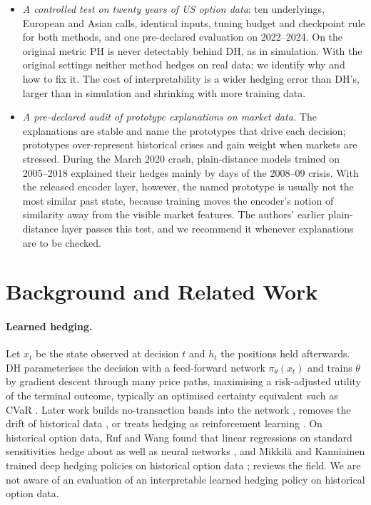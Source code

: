\documentclass[runningheads]{llncs}
\begin{document}
\begin{itemize}
\item \emph{A controlled test on twenty years of US option data}: ten underlyings, European and Asian
calls, identical inputs, tuning budget and checkpoint rule for both methods, and one pre-declared
evaluation on 2022--2024. On the original metric PH is never detectably behind DH, as in simulation. With
the original settings neither method hedges on real data; we identify why and how to fix it. The cost of interpretability is a wider hedging error than DH's, larger than in simulation and
shrinking with more training data.
\item \emph{A pre-declared audit of prototype explanations on market data.} The explanations are stable and
name the prototypes that drive each decision; prototypes over-represent historical crises and gain weight
when markets are stressed. During the March 2020 crash, plain-distance models trained on 2005--2018
explained their hedges mainly by days of the 2008--09 crisis. With the released encoder layer, however, the
named prototype is usually not the most similar past state, because training moves the encoder's notion of
similarity away from the visible market features. The authors' earlier plain-distance layer passes this test, and we recommend it
whenever explanations are to be checked.
\end{itemize}

\section{Background and Related Work}

\paragraph{Learned hedging.} Let $x_t$ be the state observed at decision $t$ and $h_t$ the positions held
afterwards. DH parameterises the decision with a feed-forward network $\pi_\theta(x_t)$ and trains $\theta$
by gradient descent through many price paths, maximising a risk-adjusted utility of the terminal outcome,
typically an optimised certainty equivalent such as CVaR \cite{rockafellar2000,bental2007oce,buehler2019deep}.
Later work builds no-transaction bands into the network \cite{imaki2021notransaction}, removes the drift of
historical data \cite{buehler2021drift}, or treats hedging as reinforcement learning
\cite{halperin2020qlbs,kolm2019dynamic,cao2021deep,vittori2020option}. On historical option data, Ruf and
Wang found that linear regressions on standard sensitivities hedge about as well as neural networks
\cite{ruf2022hedging}, and Mikkil\"a and Kanniainen trained deep hedging policies on historical option data
\cite{mikkila2023empirical}; \cite{ruf2020review} reviews the field. We are not aware of an evaluation of an
interpretable learned hedging policy on historical option data.
\end{document}
